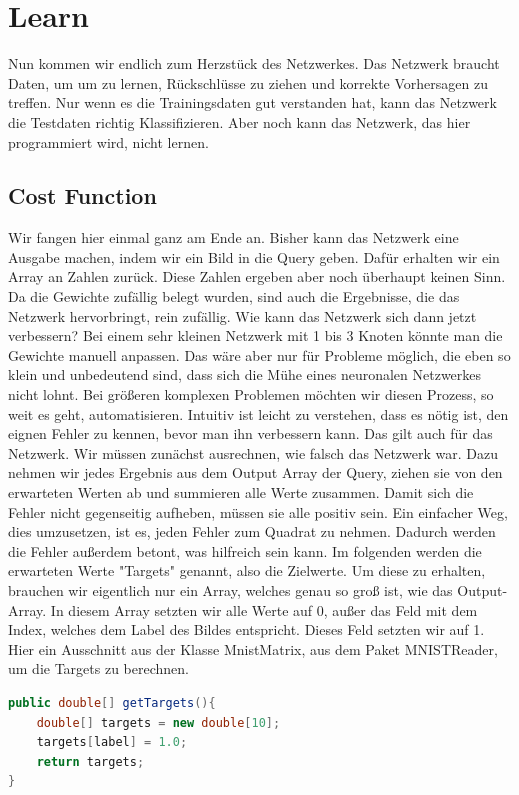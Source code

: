 \documentclass[12pt]{article}
\begin{document}
\section{Learn}Nun kommen wir endlich zum Herzstück des Netzwerkes. Das Netzwerk braucht Daten, um um zu lernen, Rückschlüsse zu ziehen und korrekte Vorhersagen zu treffen. Nur wenn es die Trainingsdaten gut verstanden hat, kann das Netzwerk die Testdaten richtig Klassifizieren. Aber noch kann das Netzwerk, das hier programmiert wird, nicht lernen.
\subsection{Cost Function}Wir fangen hier einmal ganz am Ende an. Bisher kann das Netzwerk eine Ausgabe machen, indem wir ein Bild in die Query geben. Dafür erhalten wir ein Array an Zahlen zurück. Diese Zahlen ergeben aber noch überhaupt keinen Sinn. Da die Gewichte zufällig belegt wurden, sind auch die Ergebnisse, die das Netzwerk hervorbringt, rein zufällig. 
Wie kann das Netzwerk sich dann jetzt verbessern? Bei einem sehr kleinen Netzwerk mit 1 bis 3 Knoten könnte man die Gewichte manuell anpassen. Das wäre aber nur für Probleme möglich, die eben so klein und unbedeutend sind, dass sich die Mühe eines neuronalen Netzwerkes nicht lohnt. Bei größeren komplexen Problemen möchten wir diesen Prozess, so weit es geht, automatisieren.
Intuitiv ist leicht zu verstehen, dass es nötig ist, den eignen Fehler zu kennen, bevor man ihn verbessern kann. Das gilt auch für das Netzwerk. Wir müssen zunächst ausrechnen, wie falsch das Netzwerk war. Dazu nehmen wir jedes Ergebnis aus dem Output Array der Query, ziehen sie von den erwarteten Werten ab und summieren alle Werte zusammen. Damit sich die Fehler nicht gegenseitig aufheben, müssen sie alle positiv sein. Ein einfacher Weg, dies umzusetzen, ist es, jeden Fehler zum Quadrat zu nehmen. Dadurch werden die Fehler außerdem betont, was hilfreich sein kann. Im folgenden werden die erwarteten Werte "Targets" genannt, also die Zielwerte. Um diese zu erhalten, brauchen wir eigentlich nur ein Array, welches genau so groß ist, wie das Output-Array. In diesem Array setzten wir alle Werte auf 0, außer das Feld mit dem Index, welches dem Label des Bildes entspricht. Dieses Feld setzten wir auf 1. Hier ein Ausschnitt aus der Klasse MnistMatrix, aus dem Paket MNISTReader, um die Targets zu berechnen.
\begin{lstlisting}[language=Java]
public double[] getTargets(){
    double[] targets = new double[10];
    targets[label] = 1.0;
    return targets;
} 
\end{lstlisting}
\end{document}
